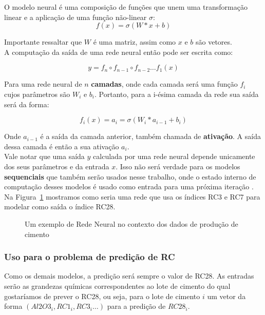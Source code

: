 O modelo neural é uma composição de funções que unem uma transformação linear e
a aplicação de uma função não-linear $\sigma$: \\

\[ f(x)=  \sigma(W*x + b) \]

Importante ressaltar que $W$ é uma matriz, assim como $x$ e $b$ são vetores. \\

A computação da saída de uma rede neural então pode ser escrita como:

\[   y = f_n \circ f_{n-1} \circ f_{n-2} \dots f_1(x)  \]

Para uma rede neural de $n$ \textbf{camadas}, onde cada camada será uma função
$f_i$ cujos parâmetros são $W_i$ e $b_i$. Portanto, para a i-ésima camada da rede
sua saída será da forma: 

\[ f_i (x)=  a_i = \sigma(W_i*a_{i-1} + b_i) \]

Onde $a_{i-1}$ é a saída da camada anterior, também chamada de
\textbf{ativação}. A saída dessa camada é então a sua ativação $a_i$. \\ 

Vale notar que uma saída $y$ calculada por uma rede neural depende unicamente dos
seus parâmetros e da entrada $x$. Isso não será verdade para os modelos
\textbf{sequenciais} que também serão usados nesse trabalho, onde o estado
interno de computação desses modelos é usado como entrada para uma próxima
iteração \citep{dlbook}. \\

Na Figura~\ref{fig:nn} mostramos como seria uma rede que usa os índices RC3 e RC7 para
modelar como saída o índice RC28. \\  

\begin{figure}
  \centering
  
  \caption{Um exemplo de Rede Neural no contexto dos dados de produção de cimento}
  \label{fig:nn}
\end{figure}


\subsubsection{Uso para o problema de predição de RC}

Como os demais modelos, a predição será sempre o valor de RC28. As entradas
serão as grandezas químicas correspondentes ao lote de cimento do qual
gostaríamos de prever o RC28, ou seja, para o lote de cimento $i$ um vetor da forma $(Al2O3_i, RC1_i, RC3_i
\dots )$ para a predição de $RC28_i$. 



